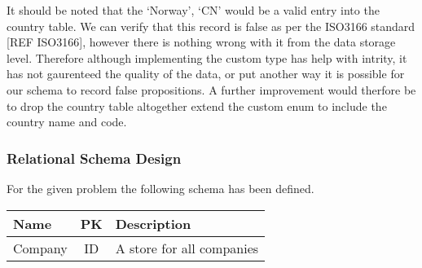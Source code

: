 \documentclass[12pt]{article}
\begin{document}
It should be noted that the `Norway', `CN' would be a valid entry into the country table. We can verify that this record is false as per the ISO3166 standard [REF ISO3166], however there is nothing wrong with it from the data storage level. Therefore although implementing the custom type has help with intrity, it has not gaurenteed the quality of the data, or put another way it is possible for our schema to record false propositions. A further improvement would therfore be to drop the country table altogether extend the custom enum to include the country name and code.

\subsubsection{Relational Schema Design}
For the given problem the following schema has been defined.

\begin{tabular}{l|c|l}
Name&PK&Description\\\hline
Company&ID&A store for all companies\\
\end{tabular}
\end{document}
